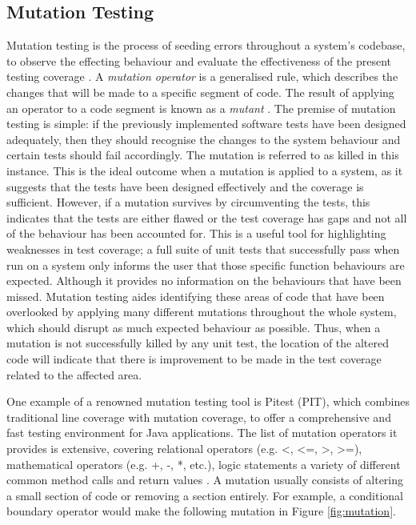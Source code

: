 \documentclass[a4paper,12pt]{article}
\begin{document}
\subsection{Mutation Testing} \label{section:Mutation Testing}
Mutation testing is the process of seeding errors throughout a system’s codebase, to observe the effecting behaviour and evaluate the effectiveness of the present testing coverage \citep{adrion81}. A \textit{mutation operator} is a generalised rule, which describes the changes that will be made to a specific segment of code. The result of applying an operator to a code segment is known as a \textit{mutant} \citep{ammann17}. The premise of mutation testing is simple: if the previously implemented software tests have been designed adequately, then they should recognise the changes to the system behaviour and certain tests should fail accordingly. The mutation is referred to as killed in this instance. This is the ideal outcome when a mutation is applied to a system, as it suggests that the tests have been designed effectively and the coverage is sufficient. However, if a mutation survives by circumventing the tests, this indicates that the tests are either flawed or the test coverage has gaps and not all of the behaviour has been accounted for. This is a useful tool for highlighting weaknesses in test coverage; a full suite of unit tests that successfully pass when run on a system only informs the user that those specific function behaviours are expected. Although it provides no information on the behaviours that have been missed. Mutation testing aides identifying these areas of code that have been overlooked by applying many different mutations throughout the whole system, which should disrupt as much expected behaviour as possible. Thus, when a mutation is not successfully killed by any unit test, the location of the altered code will indicate that there is improvement to be made in the test coverage related to the affected area.

One example of a renowned mutation testing tool is Pitest (PIT), which combines traditional line coverage with mutation coverage, to offer a comprehensive and fast testing environment for Java applications. The list of mutation operators it provides is extensive, covering relational operators (e.g. \textless, \textless=, \textgreater, \textgreater=), mathematical operators (e.g. +, -, *, etc.), logic statements a variety of different common method calls and return values \citep{pit19}. A mutation usually consists of altering a small section of code or removing a section entirely. For example, a conditional boundary operator would make the following mutation  in Figure \ref{fig:mutation}. 
\end{document}
